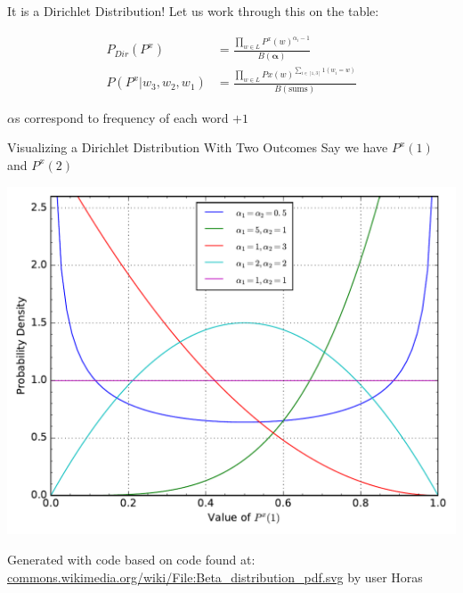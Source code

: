 \documentclass[11pt]{beamer}
\begin{document}
	\begin{frame}{It is a Dirichlet Distribution!}
		Let us work through this on the table:
	
		\begin{align*}
			P_{Dir}(P^x) & = \frac{\prod_{w \in L} P^{x}(w)^{\alpha_i - 1}}{B(\boldsymbol{\alpha})} \\
			P(P^x \vert w_3,w_2,w_1) & = \frac{\prod_{w \in L} P{x}(w)^{\sum_{i \in [1,3]} 1(w_i = w)}}{B(\text{sums})}
		\end{align*}
		
		\vspace{10pt} $\alpha$s correspond to frequency of each word $+1$
	\end{frame}	
	
	\begin{frame}{Visualizing a Dirichlet Distribution With Two Outcomes}
		Say we have $P^x(1)$ and $P^x(2)$
	
		\begin{center}
			\includegraphics[width=0.7\linewidth]{dirichlet_distribution_pdf}
		\end{center}
		
		\begin{tiny}
			Generated with code based on code found at: \url{commons.wikimedia.org/wiki/File:Beta_distribution_pdf.svg} by user Horas
		\end{tiny}
	\end{frame}
		
\end{document}
